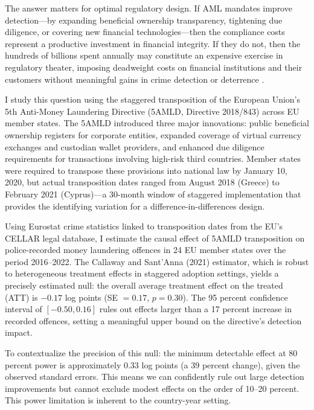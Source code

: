 \documentclass[12pt]{article}
\begin{document}
The answer matters for optimal regulatory design. If AML mandates improve detection---by expanding beneficial ownership transparency, tightening due diligence, or covering new financial technologies---then the compliance costs represent a productive investment in financial integrity. If they do not, then the hundreds of billions spent annually may constitute an expensive exercise in regulatory theater, imposing deadweight costs on financial institutions and their customers without meaningful gains in crime detection or deterrence \citep{pol2020}.

I study this question using the staggered transposition of the European Union's 5th Anti-Money Laundering Directive (5AMLD, Directive 2018/843) across EU member states. The 5AMLD introduced three major innovations: public beneficial ownership registers for corporate entities, expanded coverage of virtual currency exchanges and custodian wallet providers, and enhanced due diligence requirements for transactions involving high-risk third countries. Member states were required to transpose these provisions into national law by January 10, 2020, but actual transposition dates ranged from August 2018 (Greece) to February 2021 (Cyprus)---a 30-month window of staggered implementation that provides the identifying variation for a difference-in-differences design.

Using Eurostat crime statistics linked to transposition dates from the EU's CELLAR legal database, I estimate the causal effect of 5AMLD transposition on police-recorded money laundering offences in 24 EU member states over the period 2016--2022. The Callaway and Sant'Anna (2021) estimator, which is robust to heterogeneous treatment effects in staggered adoption settings, yields a precisely estimated null: the overall average treatment effect on the treated (ATT) is $-0.17$ log points (SE $= 0.17$, $p = 0.30$). The 95 percent confidence interval of $[-0.50, 0.16]$ rules out effects larger than a 17 percent increase in recorded offences, setting a meaningful upper bound on the directive's detection impact.

To contextualize the precision of this null: the minimum detectable effect at 80 percent power is approximately 0.33 log points (a 39 percent change), given the observed standard errors. This means we can confidently rule out large detection improvements but cannot exclude modest effects on the order of 10--20 percent. This power limitation is inherent to the country-year setting.
\end{document}
